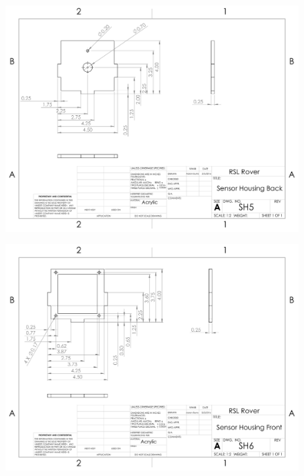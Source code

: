 \begin{figure}[H]
	\centerline{\includegraphics[angle=90,width=1.0\linewidth]{dwgs/SH5.pdf}}
\end{figure}

\begin{figure}[H]
	\centerline{\includegraphics[angle=90,width=1.0\linewidth]{dwgs/SH6.pdf}}
\end{figure}

